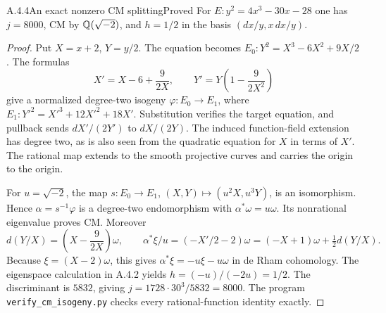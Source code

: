 \begin{result}{A.4.4}{An exact nonzero CM splitting}{Proved}
For $E:y^2=4x^3-30x-28$ one has $j=8000$, CM by $\mathbb Q(\sqrt{-2})$, and $h=1/2$ in the basis $(dx/y,x\,dx/y)$.
\end{result}
\begin{proof}
Put $X=x+2$, $Y=y/2$. The equation becomes $E_0:Y^2=X^3-6X^2+9X/2$. The formulas
\[
 X'=X-6+\frac9{2X},\qquad Y'=Y\left(1-\frac9{2X^2}\right)
\]
give a normalized degree-two isogeny $\varphi:E_0\to E_1$, where $E_1:Y'^2=X'^3+12X'^2+18X'$. Substitution verifies the target equation, and pullback sends $dX'/(2Y')$ to $dX/(2Y)$. The induced function-field extension has degree two, as is also seen from the quadratic equation for $X$ in terms of $X'$. The rational map extends to the smooth projective curves and carries the origin to the origin.

For $u=\sqrt{-2}$, the map $s:E_0\to E_1$, $(X,Y)\mapsto(u^2X,u^3Y)$, is an isomorphism. Hence $\alpha=s^{-1}\varphi$ is a degree-two endomorphism with $\alpha^*\omega=u\omega$. Its nonrational eigenvalue proves CM. Moreover
\[
 d(Y/X)=\left(X-\frac9{2X}\right)\omega,
 \qquad \alpha^*\xi/u=(-X'/2-2)\omega
 =(-X+1)\omega+\tfrac12d(Y/X).
\]
Because $\xi=(X-2)\omega$, this gives $\alpha^*\xi=-u\xi-u\omega$ in de Rham cohomology. The eigenspace calculation in A.4.2 yields $h=(-u)/(-2u)=1/2$. The discriminant is $5832$, giving $j=1728\cdot30^3/5832=8000$. The program \texttt{verify\_cm\_isogeny.py} checks every rational-function identity exactly.
\end{proof}

